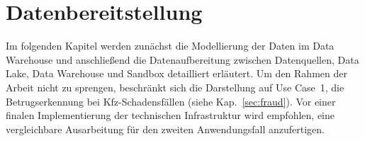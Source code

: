 \clearpage
\chapter{Datenbereitstellung}
\label{chap:datenbereitstellung}
\label{chap:datenmodell}

Im folgenden Kapitel werden zunächst die Modellierung der Daten im Data Warehouse
und anschließend die Datenaufbereitung zwischen Datenquellen, Data Lake,
Data Warehouse und Sandbox detailliert erläutert. Um den Rahmen der Arbeit nicht
zu sprengen, beschränkt sich die Darstellung auf Use Case~1, die Betrugserkennung
bei Kfz-Schadensfällen (siehe Kap.~\ref{sec:fraud}). Vor einer finalen
Implementierung der technischen Infrastruktur wird empfohlen, eine vergleichbare
Ausarbeitung für den zweiten Anwendungsfall anzufertigen.



